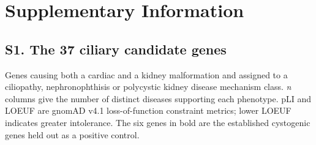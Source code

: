 \documentclass[11pt,a4paper]{article}
\begin{document}

\newpage
\appendix
\section{Supplementary Information}

\subsection*{S1. The 37 ciliary candidate genes}

Genes causing both a cardiac and a kidney malformation and assigned to a ciliopathy,
nephronophthisis or polycystic kidney disease mechanism class. \textit{n} columns give the
number of distinct diseases supporting each phenotype. pLI and LOEUF are gnomAD v4.1
loss-of-function constraint metrics; lower LOEUF indicates greater intolerance. The six
genes in bold are the established cystogenic genes held out as a positive control.
\end{document}
